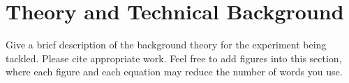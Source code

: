 \section{Theory and Technical Background}
\label{sec:theory-and-technical-background}
Give a brief description of the background theory for the experiment being tackled.
Please cite appropriate work.
Feel free to add figures into this section, where
each figure and each equation may reduce the number of words you use.
